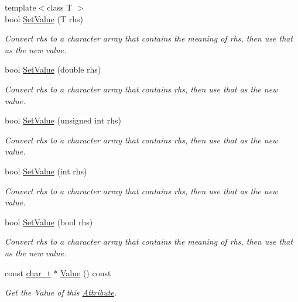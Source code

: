 \begin{DoxyCompactItemize}
{\footnotesize template$<$class T $>$ }\\bool \hyperlink{classMezzanine_1_1xml_1_1Attribute_ab4ab2fb15cd198cd8527d796583cf994}{SetValue} (T rhs)
\begin{DoxyCompactList}\small\item\em Convert rhs to a character array that contains the meaning of rhs, then use that as the new value. \item\end{DoxyCompactList}\item 
bool \hyperlink{classMezzanine_1_1xml_1_1Attribute_aa6f33397178b9823d85906692320a440}{SetValue} (double rhs)
\begin{DoxyCompactList}\small\item\em Convert rhs to a character array that contains rhs, then use that as the new value. \item\end{DoxyCompactList}\item 
bool \hyperlink{classMezzanine_1_1xml_1_1Attribute_a3c47acd1ef9cdf05f312fa954cf988a6}{SetValue} (unsigned int rhs)
\begin{DoxyCompactList}\small\item\em Convert rhs to a character array that contains rhs, then use that as the new value. \item\end{DoxyCompactList}\item 
bool \hyperlink{classMezzanine_1_1xml_1_1Attribute_ae17cb2b4aadcf29fc74e6d16fa1ad746}{SetValue} (int rhs)
\begin{DoxyCompactList}\small\item\em Convert rhs to a character array that contains rhs, then use that as the new value. \item\end{DoxyCompactList}\item 
bool \hyperlink{classMezzanine_1_1xml_1_1Attribute_a4b4b035128dfe3c7fd70e228c70d5118}{SetValue} (bool rhs)
\begin{DoxyCompactList}\small\item\em Convert rhs to a character array that contains the meaning of rhs, then use that as the new value. \item\end{DoxyCompactList}\item 
const \hyperlink{namespaceMezzanine_1_1xml_a29b8a47c179e9895c4e9e66c45d1dbbc}{char\_\-t} $\ast$ \hyperlink{classMezzanine_1_1xml_1_1Attribute_aa91fc0680d73602071a1b67b009cdb63}{Value} () const 
\begin{DoxyCompactList}\small\item\em Get the Value of this \hyperlink{classMezzanine_1_1xml_1_1Attribute}{Attribute}. \item\end{DoxyCompactList}\end{DoxyCompactItemize}
